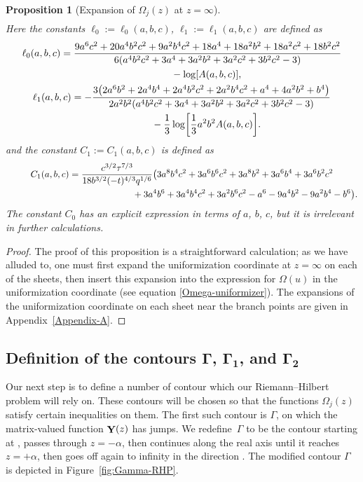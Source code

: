 \documentclass[pdftex]{sigma}
\DeclareMathOperator{\YY}{{\bf Y}}
\numberwithin{equation}{section}
\newtheorem{Proposition}[Theorem]{Proposition}
 { \theoremstyle{definition}
\newtheorem{Definition}[Theorem]{Definition}
\newtheorem{Note}[Theorem]{Note}
\newtheorem{Example}[Theorem]{Example}
\newtheorem{Remark}[Theorem]{Remark} }
\begin{document}
\begin{Proposition}[Expansion of $\Omega_j(z)$ at $z=\infty$]
\begin{align}
 \end{align}
 Here the constants $\ell_0 := \ell_0(a,b,c)$, $\ell_1 := \ell_1(a,b,c)$ are defined as
 \begin{gather*}
 \ell_0(a,b,c) = \frac{9a^6c^2 + 20a^4b^2c^2 + 9a^2b^4c^2 + 18a^4 + 18a^2b^2 + 18a^2c^2 + 18b^2c^2}{6(a^4b^2c^2 + 3a^4 + 3a^2b^2 + 3a^2c^2 + 3b^2c^2 - 3)}\\
 \hphantom{\ell_0(a,b,c) =}{}
 -\log[A(a,b,c)],\\
 \ell_1(a,b,c) = -\frac{3\bigl(2a^6b^2 + 2a^4b^4 + 2a^4b^2c^2 + 2a^2b^4c^2 + a^4 + 4a^2b^2 + b^4\bigr)}{2a^2b^2(a^4b^2c^2 + 3a^4 + 3a^2b^2 + 3a^2c^2 + 3b^2c^2 - 3)}\\
 \hphantom{\ell_1(a,b,c) =}{}
 - \frac{1}{3}\log \biggl[\frac{1}{3}a^2b^2 A(a,b,c)\biggr].
 \end{gather*}
 and the constant $C_1 := C_1(a,b,c)$ is defined as
 \begin{gather}
 C_1(a,b,c) = \frac{c^{3/2}\tau^{7/3}}{18b^{3/2}(-t)^{4/3}q^{1/6}}\bigl(3a^8b^4c^2 + 3a^6b^6c^2 + 3a^8b^2 + 3a^6b^4 + 3a^6b^2c^2\label{C1-constant}\\
 \hphantom{C_1(a,b,c) = \frac{c^{3/2}\tau^{7/3}}{18b^{3/2}(-t)^{4/3}q^{1/6}}\bigl(}{}
 + 3a^4b^6 + 3a^4b^4c^2 + 3a^2b^6c^2 - a^6 - 9a^4b^2 - 9a^2b^4 - b^6\bigr).\nonumber
 \end{gather}
 \textit{The constant $C_0$ has an explicit expression in terms of $a$, $b$, $c$, but it is irrelevant in further calculations.}
 \end{Proposition}
 \begin{proof}
 The proof of this proposition is a straightforward calculation; as we have alluded to, one must first expand the uniformization coordinate at $z=\infty$ on each of the
 sheets, then insert this expansion into the expression for $\Omega(u)$ in the uniformization coordinate (see equation \eqref{Omega-uniformizer}). The expansions of the uniformization coordinate on each sheet near the branch points are given in Appendix~\ref{Appendix-A}.
 \end{proof}


\subsection[Definition of the contours $\Gamma$, $\Gamma_1$, and $\Gamma_2$]{Definition of the contours $\boldsymbol{\Gamma}$, $\boldsymbol{\Gamma_1}$, and $\boldsymbol{\Gamma_2}$}
Our next step is to define a number of contour which our Riemann--Hilbert problem will rely on.
These contours will be chosen so that the functions $\Omega_j(z)$ satisfy certain inequalities on them. The first such contour is $\Gamma$, on which the
matrix-valued function $\YY(z)$ has jumps. We redefine~$\Gamma$ to be the contour starting at , passes through $z=-\alpha$,
then continues along the real axis until it reaches $z= + \alpha$, then goes off again to infinity in the direction . The modified
contour $\Gamma$ is depicted in Figure~\ref{fig:Gamma-RHP}.
\end{document}
